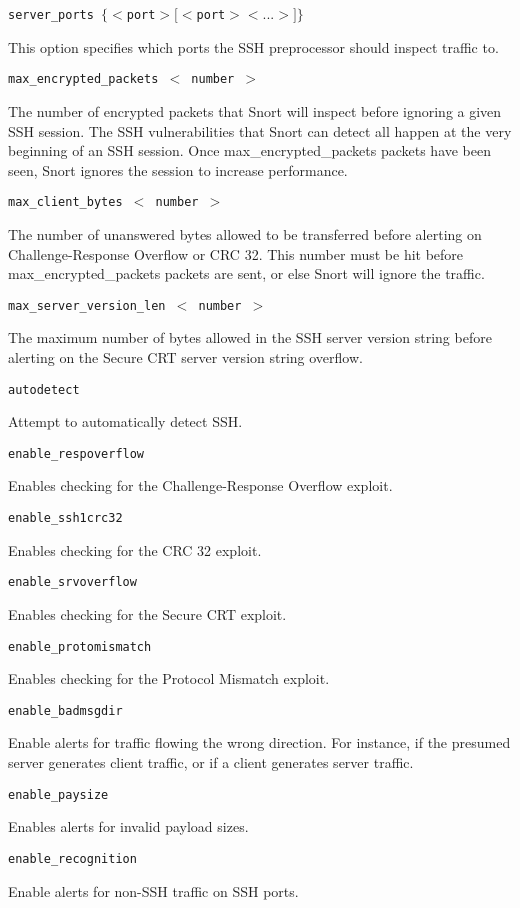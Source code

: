 \documentclass[english]{report}
\newcounter{slistnum}
\newenvironment{slist}
{ \begin{list}{ {\bf \arabic{slistnum}.} }{\usecounter{slistnum} } }
{ \end{list} }
\begin{document}
\begin{slist}

\item \texttt{server\_ports $\{ <$port$> [<$port$> <...>] \}$}

This option specifies which ports the SSH preprocessor should inspect traffic
to.

\item \texttt{max\_encrypted\_packets $<$ number $>$}

The number of encrypted packets that Snort will inspect before ignoring a given
SSH session. The SSH vulnerabilities that Snort can detect all happen at the
very beginning of an SSH session. Once max\_encrypted\_packets packets have been
seen, Snort ignores the session to increase performance.

\item \texttt{max\_client\_bytes $<$ number $>$}

The number of unanswered bytes allowed to be transferred before alerting on
Challenge-Response Overflow or CRC 32. This number must be hit before
max\_encrypted\_packets packets are sent, or else Snort will ignore the traffic.

\item \texttt{max\_server\_version\_len $<$ number $>$}

The maximum number of bytes allowed in the SSH server version string before
alerting on the Secure CRT server version string overflow.

\item \texttt{autodetect}

Attempt to automatically detect SSH.

\item \texttt{enable\_respoverflow}

Enables checking for the Challenge-Response Overflow exploit.

\item \texttt{enable\_ssh1crc32}

Enables checking for the CRC 32 exploit.

\item \texttt{enable\_srvoverflow}

Enables checking for the Secure CRT exploit.

\item \texttt{enable\_protomismatch}

Enables checking for the Protocol Mismatch exploit.

\item \texttt{enable\_badmsgdir}

Enable alerts for traffic flowing the wrong direction. For instance, if the
presumed server generates client traffic, or if a client generates server
traffic.

\item \texttt{enable\_paysize}

Enables alerts for invalid payload sizes.

\item \texttt{enable\_recognition}

Enable alerts for non-SSH traffic on SSH ports.

\end{slist}
\end{document}
